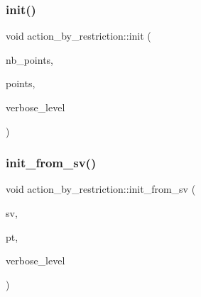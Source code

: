 \mbox{\label{classaction__by__restriction_af98e88c513afe51527082f11aac571f8}} 
\subsubsection{\texorpdfstring{init()}{init()}}
{\footnotesize\ttfamily void action\+\_\+by\+\_\+restriction\+::init (\begin{DoxyParamCaption}\item[{\mbox{\hyperlink{galois_8h_a09fddde158a3a20bd2dcadb609de11dc}{I\+NT}}}]{nb\+\_\+points,  }\item[{\mbox{\hyperlink{galois_8h_a09fddde158a3a20bd2dcadb609de11dc}{I\+NT}} $\ast$}]{points,  }\item[{\mbox{\hyperlink{galois_8h_a09fddde158a3a20bd2dcadb609de11dc}{I\+NT}}}]{verbose\+\_\+level }\end{DoxyParamCaption})}

\mbox{\label{classaction__by__restriction_a08b2a71881e69fb63dd7d66ba0f6ea50}} 
\subsubsection{\texorpdfstring{init\+\_\+from\+\_\+sv()}{init\_from\_sv()}}
{\footnotesize\ttfamily void action\+\_\+by\+\_\+restriction\+::init\+\_\+from\+\_\+sv (\begin{DoxyParamCaption}\item[{\mbox{\hyperlink{galois_8h_a09fddde158a3a20bd2dcadb609de11dc}{I\+NT}} $\ast$}]{sv,  }\item[{\mbox{\hyperlink{galois_8h_a09fddde158a3a20bd2dcadb609de11dc}{I\+NT}}}]{pt,  }\item[{\mbox{\hyperlink{galois_8h_a09fddde158a3a20bd2dcadb609de11dc}{I\+NT}}}]{verbose\+\_\+level }\end{DoxyParamCaption})}

\mbox{\label{classaction__by__restriction_adf791e945d5b8db41dd6ab9be10f6471}} 
